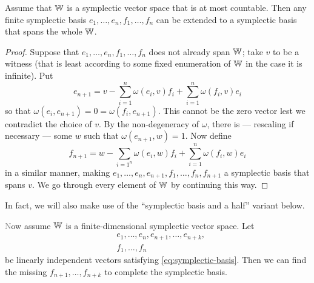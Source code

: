 \begin{proposition}\label{prop:symplectic-basis}
    Assume that $\mathbb{W}$ is a symplectic vector space that is at most countable.
    Then any finite symplectic basis $e_1, \ldots, e_n, f_1, \ldots, f_n$ 
    can be extended to a symplectic basis that spans the whole $\mathbb{W}$.
\end{proposition}
\begin{proof}
    Suppose that $e_1, \ldots, e_n, f_1, \ldots, f_n$ does not already span $\mathbb{W}$;
    take $v$ to be a witness (that is least according to some fixed enumeration of $\mathbb{W}$ 
    in the case it is infinite).
    Put
    \[
        e_{n+1} = v - \sum_{i=1}^n \omega(e_i, v) f_i + \sum_{i=1}^n \omega(f_i, v) e_i
    \]
    so that $\omega(e_i, e_{n+1}) = 0 = \omega(f_i, e_{n+1})$.
    This cannot be the zero vector lest we contradict the choice of $v$.
    By the non-degeneracy of $\omega$, there is --- rescaling if necessary 
    --- some $w$ such that $\omega(e_{n+1}, w) = 1$. 
    Now define
    \[
        f_{n+1} = w - \sum_{i=1^n} \omega(e_i, w) f_i + \sum_{i=1}^n \omega(f_i, w) e_i
    \]
    in a similar manner, 
    making $e_1, \ldots, e_n, e_{n+1}, f_1, \ldots, f_n, f_{n+1}$ a symplectic basis that spans $v$.
    We go through every element of $\mathbb{W}$ by continuing this way.
\end{proof}

\color{gray}
In fact, we will also make use of the ``symplectic basis and a half'' variant below. 
\begin{proposition}\label{prop:symplectic-basis-and-a-half}\textcolor{gray}
    Now assume $\mathbb{W}$ is a finite-dimensional symplectic vector space.
    Let 
    \begin{align*} 
        &e_1, \ldots, e_n, e_{n+1}, \ldots, e_{n+k}, \\
        &f_1, \ldots, f_n
    \end{align*}
    be linearly independent vectors satisfying \eqref{eq:symplectic-basis}.
    Then we can find the missing $f_{n+1}, \ldots, f_{n+k}$ to complete the symplectic basis.
\end{proposition}
\color{black}

